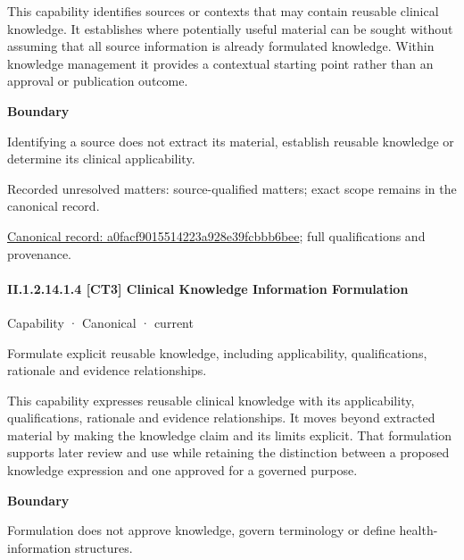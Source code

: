This capability identifies sources or contexts that may contain reusable clinical knowledge. It establishes where potentially useful material can be sought without assuming that all source information is already formulated knowledge. Within knowledge management it provides a contextual starting point rather than an approval or publication outcome.



\textbf{Boundary}



Identifying a source does not extract its material, establish reusable knowledge or determine its clinical applicability.


{\small Recorded unresolved matters: source-qualified matters; exact scope remains in the canonical record.}\par
{\footnotesize \href{../../../../continuum/strategy/capability/a0facf9015514223a928e39fcbbb6bee.md}{Canonical record: a0facf9015514223a928e39fcbbb6bee}; full qualifications and provenance.}\par
\paragraph*{II.1.2.14.1.4 [CT3] Clinical Knowledge Information Formulation}
\label{navigation:II.1.2.14.1.4}

\label{element:05421be130ff4020b119c314aca46573}
{\small Capability · Canonical · current}\par

Formulate explicit reusable knowledge, including applicability, qualifications, rationale and evidence relationships.



This capability expresses reusable clinical knowledge with its applicability, qualifications, rationale and evidence relationships. It moves beyond extracted material by making the knowledge claim and its limits explicit. That formulation supports later review and use while retaining the distinction between a proposed knowledge expression and one approved for a governed purpose.



\textbf{Boundary}



Formulation does not approve knowledge, govern terminology or define health-information structures.


